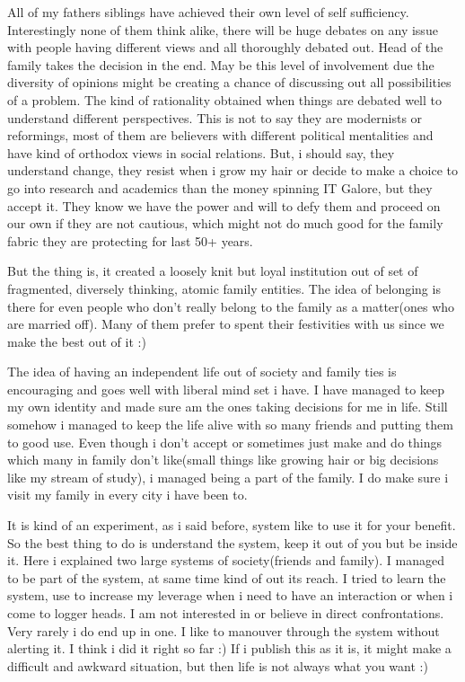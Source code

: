 All of my fathers siblings have achieved their own level of self sufficiency. Interestingly none of them think alike, there will be huge debates on any issue with people having different views and all thoroughly debated out. Head of the family takes the decision in the end. May be this level of involvement due the diversity of opinions might be creating a chance of discussing out all possibilities of a problem. The kind of rationality obtained when things are debated well to understand different perspectives. This is not to say they are modernists or reformings, most of them are believers with different political mentalities and have kind of orthodox views in social relations. But, i should say, they understand change, they resist when i grow my hair or decide to make a choice to go into research and academics than the money spinning IT Galore, but they accept it. They know we have the power and will to defy them and proceed on our own if they are not cautious, which might not do much good for the family fabric they are protecting for last 50+ years.

But the thing is, it created a loosely knit but loyal institution out of set of fragmented, diversely thinking, atomic family entities. The idea of belonging is there for even people who don't really belong to the family as a matter(ones who are married off). Many of them prefer to spent their festivities with us since we make the best out of it :) 

The idea of having an independent life out of society and family ties is encouraging and goes well with liberal mind set i have. I have managed to keep my own identity and made sure am the ones taking decisions for me in life. Still somehow i managed to keep the life alive with so many friends and putting them to good use. Even though i don't accept or sometimes just make and do things which many in family don't like(small things like growing hair or big decisions like my stream of study), i managed being a part of the family. I do make sure i visit my family in every city i have been to. 

It is kind of an experiment, as i said before, system like to use it for your benefit. So the best thing to do is understand the system, keep it out of you but be inside it. Here i explained two large systems of society(friends and family). I managed to be part of the system, at same time kind of out its reach. I tried to learn the system, use to increase my leverage when i need to have an interaction or when i come to logger heads. I am not interested in or believe in direct confrontations. Very rarely i do end up in one. I like to manouver through the system without alerting it. I think i did it right so far :) If i publish this as it is, it might make a difficult and awkward situation, but then life is not always what you want :)

\newpage 
